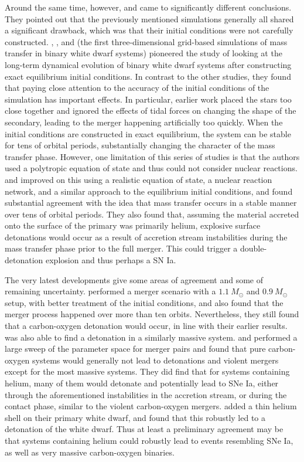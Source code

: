 \documentclass{emulateapj}
\begin{document}
Around the same time, however, \cite{guillochon:2010} and
\cite{dan:2011} came to significantly different conclusions. They
pointed out that the previously mentioned simulations generally all
shared a significant drawback, which was that their initial conditions
were not carefully constructed. \cite{motl:2002}, \cite{dsouza:2006},
and \cite{motl:2007} (the first three-dimensional grid-based
simulations of mass transfer in binary white dwarf systems) pioneered
the study of looking at the long-term dynamical evolution of binary
white dwarf systems after constructing exact equilibrium initial
conditions. In contrast to the other studies, they found that paying
close attention to the accuracy of the initial conditions of the
simulation has important effects. In particular, earlier work placed
the stars too close together and ignored the effects of tidal forces
on changing the shape of the secondary, leading to the merger
happening artificially too quickly. When the initial conditions are
constructed in exact equilibrium, the system can be stable for tens of
orbital periods, substantially changing the character of the mass
transfer phase. However, one limitation of this series of studies is
that the authors used a polytropic equation of state and thus could
not consider nuclear reactions. \cite{guillochon:2010} and
\cite{dan:2011} improved on this using a realistic equation of state,
a nuclear reaction network, and a similar approach to the equilibrium
initial conditions, and found substantial agreement with the idea that
mass transfer occurs in a stable manner over tens of orbital
periods. They also found that, assuming the material accreted onto the
surface of the primary was primarily helium, explosive surface
detonations would occur as a result of accretion stream instabilities
during the mass transfer phase prior to the full merger. This could
trigger a double-detonation explosion and thus perhaps a SN Ia.

The very latest developments give some areas of agreement and some of
remaining uncertainty. \cite{pakmor:2012} performed a merger scenario
with a $1.1\ M_\odot$ and $0.9\ M_\odot$ setup, with better treatment
of the initial conditions, and also found that the merger process
happened over more than ten orbits. Nevertheless, they still found
that a carbon-oxygen detonation would occur, in line with their
earlier results. \cite{moll:2014} was also able to find a detonation
in a similarly massive system. \cite{dan:2012} and \cite{dan:2014}
performed a large sweep of the parameter space for merger pairs and
found that pure carbon-oxygen systems would generally not lead to
detonations and violent mergers except for the most massive
systems. They did find that for systems containing helium, many of
them would detonate and potentially lead to SNe Ia, either through the
aforementioned instabilities in the accretion stream, or during the
contact phase, similar to the violent carbon-oxygen
mergers. \cite{pakmor:2013} added a thin helium shell on their primary
white dwarf, and found that this robustly led to a detonation of the
white dwarf. Thus at least a preliminary agreement may be that systems
containing helium could robustly lead to events resembling SNe Ia, as
well as very massive carbon-oxygen binaries.
\end{document}
